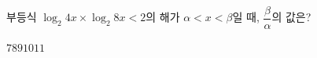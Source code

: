 부등식 $\log_2 4x\times\log_2 8x<2$의 해가 $\alpha<x<\beta$일 때, $\dfrac{\beta}{\alpha}$의 값은?
\begin{choices32}{$7$}{$8$}{$9$}{$10$}{$11$}\end{choices32}
